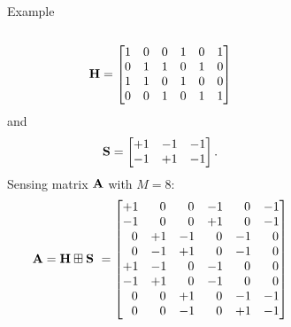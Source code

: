 \documentclass[10pt]{beamer}
\begin{document}
\begin{frame}{Example}
\begin{columns}
\begin{column}{0.5\textwidth}
\[\mathbf{H} = \begin{bmatrix}
1 & 0 & 0 & 1 & 0 & 1    \\
0 & 1 & 1 & 0 & 1 & 0 \\
1 & 1 & 0 & 1 & 0 & 0 \\
0 & 0 & 1 & 0 & 1 & 1
\end{bmatrix} \] and 
\[ \mathbf{S} = \begin{bmatrix}
+1 & -1 & -1\\
-1 & +1 & -1
\end{bmatrix}. \]
Sensing matrix $\bf A$ with $M = 8$: 
\[ \mathbf{A = H \boxplus S} \ = \begin{bmatrix}
+1 & \ \ 0 & \ \ 0 & -1 & \ \ 0 & -1\\
-1 & \ \ 0 & \ \ 0 & +1 & \ \ 0 & -1\\
\ \ 0 & +1 & -1 & \ \ 0 & -1 & \ \ 0\\
\ \ 0 & -1 & +1 & \ \ 0 & -1 & \ \ 0\\
+1 & -1 & \ \ 0 & -1 & \ \ 0 &\ \ 0\\
-1 & +1 & \ \ 0 & -1 & \ \ 0 &\ \ 0\\
\ \ 0 & \ \ 0 & +1 & \ \ 0 & -1 & -1\\
\ \ 0 & \ \ 0 & -1 & \ \ 0 & +1 & -1
\end{bmatrix}
 \]
\end{column}
\begin{column}{0.48\textwidth}
\begin{figure}
\scalebox{3}{}
\end{figure}
\end{column}

\end{columns}
\end{frame}
\end{document}
